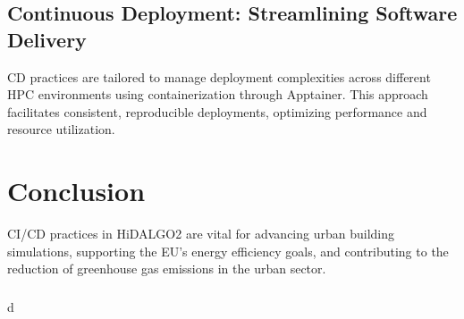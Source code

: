 \documentclass[runningheads]{llncs}
\begin{document}
\subsection{Continuous Deployment: Streamlining Software Delivery}
CD practices are tailored to manage deployment complexities across different HPC environments using containerization through Apptainer. This approach facilitates consistent, reproducible deployments, optimizing performance and resource utilization.

\section{Conclusion}
CI/CD practices in HiDALGO2 are vital for advancing urban building simulations, supporting the EU's energy efficiency goals, and contributing to the reduction of greenhouse gas emissions in the urban sector.

\begin{credits}
\subsubsection{\ackname} d

\end{credits}



\end{document}
